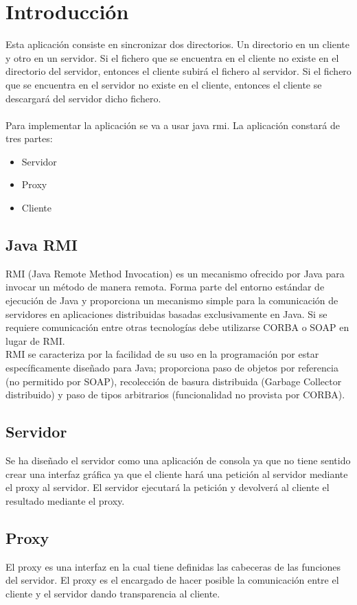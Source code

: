 \chapter{Introducción}
Esta aplicación consiste en sincronizar dos directorios. Un directorio en un cliente y otro en un servidor. Si el fichero que se encuentra en el cliente no existe en el directorio del servidor, entonces el cliente subirá el fichero al servidor. Si el fichero que se encuentra en el servidor no existe en el cliente, entonces el cliente se descargará del servidor dicho fichero. \\ \\ Para implementar la aplicación se va a usar java rmi. La aplicación constará de tres partes:
\begin{itemize}
	\item Servidor
	\item Proxy
	\item Cliente
\end{itemize}

\section{Java RMI}
RMI (Java Remote Method Invocation) es un mecanismo ofrecido por Java para invocar un método de manera remota. Forma parte del entorno estándar de ejecución de Java y proporciona un mecanismo simple para la comunicación de servidores en aplicaciones distribuidas basadas exclusivamente en Java. Si se requiere comunicación entre otras tecnologías debe utilizarse CORBA o SOAP en lugar de RMI.\\
RMI se caracteriza por la facilidad de su uso en la programación por estar específicamente diseñado para Java; proporciona paso de objetos por referencia (no permitido por SOAP), recolección de basura distribuida (Garbage Collector distribuido) y paso de tipos arbitrarios (funcionalidad no provista por CORBA).

\section{Servidor}
Se ha diseñado el servidor como una aplicación de consola ya que no tiene sentido crear una interfaz gráfica ya que el cliente hará una petición al servidor mediante el proxy al servidor. El servidor ejecutará la petición y devolverá al cliente el resultado mediante el proxy.

\section{Proxy}
El proxy es una interfaz en la cual tiene definidas las cabeceras de las funciones del servidor. El proxy es el encargado de hacer posible la comunicación entre el cliente y el servidor dando transparencia al cliente.

